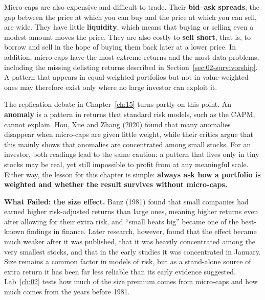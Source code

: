 Micro-caps are also expensive and difficult to trade. Their \textbf{bid--ask spreads}, the gap between the price at which you can buy and the price at which you can sell, are wide. They have little \textbf{liquidity}, which means that buying or selling even a modest amount moves the price. They are also costly to \textbf{sell short}, that is, to borrow and sell in the hope of buying them back later at a lower price. In addition, micro-caps have the most extreme returns and the most data problems, including the missing delisting returns described in Section~\ref{sec:02-survivorship}. A pattern that appears in equal-weighted portfolios but not in value-weighted ones may therefore exist only where no large investor can exploit it.

The replication debate in Chapter~\ref{ch:15} turns partly on this point. An \textbf{anomaly} is a pattern in returns that standard risk models, such as the CAPM, cannot explain. Hou, Xue and Zhang (2020) found that many anomalies disappear when micro-caps are given little weight, while their critics argue that this mainly shows that anomalies are concentrated among small stocks. For an investor, both readings lead to the same caution: a pattern that lives only in tiny stocks may be real, yet still impossible to profit from at any meaningful scale. Either way, the lesson for this chapter is simple: \textbf{always ask how a portfolio is weighted and whether the result survives without micro-caps.}

\begin{callout}
\textbf{What Failed: the size effect.} Banz (1981) found that small companies had earned higher risk-adjusted returns than large ones, meaning higher returns even after allowing for their extra risk, and ``small beats big'' became one of the best-known findings in finance. Later research, however, found that the effect became much weaker after it was published, that it was heavily concentrated among the very smallest stocks, and that in the early studies it was concentrated in January. Size remains a common factor in models of risk, but as a stand-alone source of extra return it has been far less reliable than its early evidence suggested. Lab~\ref{ch:02} tests how much of the size premium comes from micro-caps and how much comes from the years before 1981.
\end{callout}

